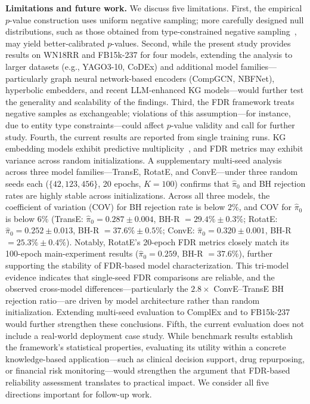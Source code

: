 \textbf{Limitations and future work.}
We discuss five limitations.
First, the empirical $p$-value construction uses uniform negative sampling; more carefully designed null distributions, such as those obtained from type-constrained negative sampling~\cite{krompass2015type}, may yield better-calibrated $p$-values.
Second, while the present study provides results on WN18RR and FB15k-237 for four models, extending the analysis to larger datasets (e.g., YAGO3-10, CoDEx) and additional model families---particularly graph neural network-based encoders (CompGCN, NBFNet), hyperbolic embedders, and recent LLM-enhanced KG models---would further test the generality and scalability of the findings.
Third, the FDR framework treats negative samples as exchangeable; violations of this assumption---for instance, due to entity type constraints---could affect $p$-value validity and call for further study.
Fourth, the current results are reported from single training runs. KG embedding models exhibit predictive multiplicity~\cite{zhu2024predictive}, and FDR metrics may exhibit variance across random initializations. A supplementary multi-seed analysis across three model families---TransE, RotatE, and ConvE---under three random seeds each ($\{42, 123, 456\}$, 20 epochs, $K=100$) confirms that $\hat{\pi}_0$ and BH rejection rates are highly stable across initializations. Across all three models, the coefficient of variation (COV) for BH rejection rate is below $2\%$, and COV for $\hat{\pi}_0$ is below $6\%$ (TransE: $\hat{\pi}_0 = 0.287 \pm 0.004$, BH-R $= 29.4\% \pm 0.3\%$; RotatE: $\hat{\pi}_0 = 0.252 \pm 0.013$, BH-R $= 37.6\% \pm 0.5\%$; ConvE: $\hat{\pi}_0 = 0.320 \pm 0.001$, BH-R $= 25.3\% \pm 0.4\%$). Notably, RotatE's 20-epoch FDR metrics closely match its 100-epoch main-experiment results ($\hat{\pi}_0 = 0.259$, BH-R $= 37.6\%$), further supporting the stability of FDR-based model characterization. This tri-model evidence indicates that single-seed FDR comparisons are reliable, and the observed cross-model differences---particularly the $2.8\times$ ConvE--TransE BH rejection ratio---are driven by model architecture rather than random initialization. Extending multi-seed evaluation to ComplEx and to FB15k-237 would further strengthen these conclusions.
Fifth, the current evaluation does not include a real-world deployment case study.
While benchmark results establish the framework's statistical properties, evaluating its utility within a concrete knowledge-based application---such as clinical decision support, drug repurposing, or financial risk monitoring---would strengthen the argument that FDR-based reliability assessment translates to practical impact.
We consider all five directions important for follow-up work.
